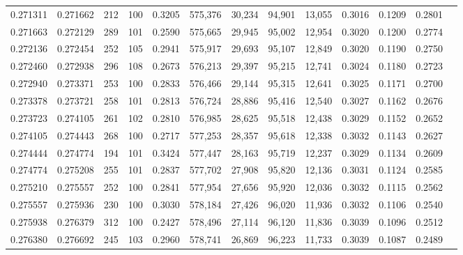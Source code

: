 \begin{tabular}{rrrrrrrrrrrrr}
0.271311 & 0.271662 &   212 & 100 &                                     0.3205 & 575,376 &  30,234 &  94,901 &  13,055 & 0.3016 & 0.1209 & 0.2801 \\
0.271663 & 0.272129 &   289 & 101 &                                     0.2590 & 575,665 &  29,945 &  95,002 &  12,954 & 0.3020 & 0.1200 & 0.2774 \\
0.272136 & 0.272454 &   252 & 105 &                                     0.2941 & 575,917 &  29,693 &  95,107 &  12,849 & 0.3020 & 0.1190 & 0.2750 \\
0.272460 & 0.272938 &   296 & 108 &                                     0.2673 & 576,213 &  29,397 &  95,215 &  12,741 & 0.3024 & 0.1180 & 0.2723 \\
0.272940 & 0.273371 &   253 & 100 &                                     0.2833 & 576,466 &  29,144 &  95,315 &  12,641 & 0.3025 & 0.1171 & 0.2700 \\
0.273378 & 0.273721 &   258 & 101 &                                     0.2813 & 576,724 &  28,886 &  95,416 &  12,540 & 0.3027 & 0.1162 & 0.2676 \\
0.273723 & 0.274105 &   261 & 102 &                                     0.2810 & 576,985 &  28,625 &  95,518 &  12,438 & 0.3029 & 0.1152 & 0.2652 \\
0.274105 & 0.274443 &   268 & 100 &                                     0.2717 & 577,253 &  28,357 &  95,618 &  12,338 & 0.3032 & 0.1143 & 0.2627 \\
0.274444 & 0.274774 &   194 & 101 &                                     0.3424 & 577,447 &  28,163 &  95,719 &  12,237 & 0.3029 & 0.1134 & 0.2609 \\
0.274774 & 0.275208 &   255 & 101 &                                     0.2837 & 577,702 &  27,908 &  95,820 &  12,136 & 0.3031 & 0.1124 & 0.2585 \\
0.275210 & 0.275557 &   252 & 100 &                                     0.2841 & 577,954 &  27,656 &  95,920 &  12,036 & 0.3032 & 0.1115 & 0.2562 \\
0.275557 & 0.275936 &   230 & 100 &                                     0.3030 & 578,184 &  27,426 &  96,020 &  11,936 & 0.3032 & 0.1106 & 0.2540 \\
0.275938 & 0.276379 &   312 & 100 &                                     0.2427 & 578,496 &  27,114 &  96,120 &  11,836 & 0.3039 & 0.1096 & 0.2512 \\
0.276380 & 0.276692 &   245 & 103 &                                     0.2960 & 578,741 &  26,869 &  96,223 &  11,733 & 0.3039 & 0.1087 & 0.2489 \\

\end{tabular}
